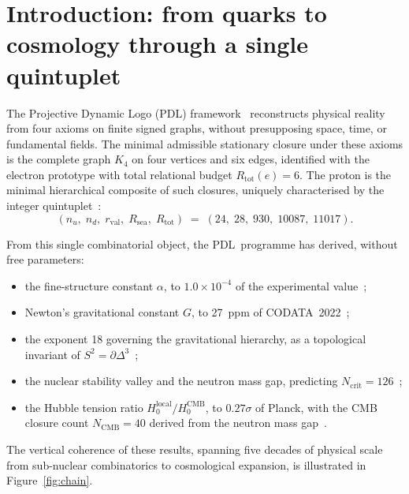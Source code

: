 \documentclass[11pt,a4paper]{article}
\theoremstyle{definition}
\newcommand{\PDL}{\textnormal{PDL}}
\newcommand{\Rsea}{R_{\mathrm{sea}}}
\newcommand{\Rtot}{R_{\mathrm{tot}}}
\newcommand{\rval}{r_{\mathrm{val}}}
\newcommand{\Kfour}{K_4}
\newcommand{\Sfour}{\partial\Delta^3}
\begin{document}
\newpage
\tableofcontents

\section{Introduction: from quarks to cosmology through a single quintuplet}
\label{sec:intro}

The Projective Dynamic Logo (\PDL) framework~\cite{PDL_Main_2026,PDL_Intro_2026} reconstructs physical reality from four axioms on finite signed graphs, without presupposing space, time, or fundamental fields. The minimal admissible stationary closure under these axioms is the complete graph $\Kfour$ on four vertices and six edges, identified with the electron prototype with total relational budget $\Rtot(e) = 6$. The proton is the minimal hierarchical composite of such closures, uniquely characterised by the integer quintuplet~\cite{Combinatorial_Proton_v2_2026}:
\begin{equation}
\label{eq:quintuplet}
(n_u,\; n_d,\; \rval,\; \Rsea,\; \Rtot) \;=\; (24,\; 28,\; 930,\; 10087,\; 11017).
\end{equation}

From this single combinatorial object, the \PDL\ programme has derived, without free parameters:
\begin{itemize}
\item the fine-structure constant $\alpha$, to $1.0\times10^{-4}$ of the experimental value~\cite{Alpha_PDL_v2_2026,Golden_Ratio_PDL_2026};
\item Newton's gravitational constant $G$, to 27~ppm of CODATA~2022~\cite{Bridge_PDL_2026};
\item the exponent 18 governing the gravitational hierarchy, as a topological invariant of $S^2 = \Sfour$~\cite{Topology_18_PDL_2026};
\item the nuclear stability valley and the neutron mass gap, predicting $N_{\mathrm{crit}} = 126$~\cite{Nuclear_Stability_PDL_2026};
\item the Hubble tension ratio $H_0^{\mathrm{local}}/H_0^{\mathrm{CMB}}$, to $0.27\sigma$ of Planck, with the CMB closure count $N_{\mathrm{CMB}} = 40$ derived from the neutron mass gap~\cite{Hubble_Resolution_PDL_2026,NCMB_PDL_2026}.
\end{itemize}

The vertical coherence of these results, spanning five decades of physical scale from sub-nuclear combinatorics to cosmological expansion, is illustrated in Figure~\ref{fig:chain}.
\end{document}
